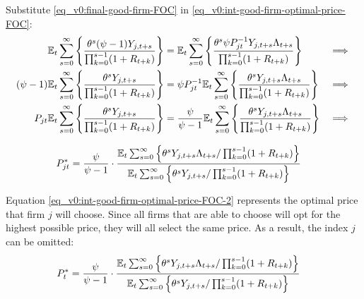\documentclass[
thesis.tex
]{subfiles}
\begin{document}
	
	Substitute \ref{eq_v0:final-good-firm-FOC} in \ref{eq_v0:int-good-firm-optimal-price-FOC}:
	\begin{alignat}{2}
		{\mathbb{E}_{t}} \sum_{s=0}^{\infty} \Bigg\{ \frac{\theta^s (\psi-1) Y_{j,t+s}}{\prod_{k=0}^{s-1}(1+R_{t+k})} \Bigg\} &= {\mathbb{E}_{t}} \sum_{s=0}^{\infty} \Bigg\{ \frac{\theta^s \psi P_{jt}^{-1} Y_{j,t+s} \Lambda_{t+s}}{\prod_{k=0}^{s-1}(1+R_{t+k})}  \Bigg\} &\implies \nonumber \\
		(\psi-1) {\mathbb{E}_{t}} \sum_{s=0}^{\infty} \Bigg\{ \frac{\theta^s Y_{j,t+s}}{\prod_{k=0}^{s-1}(1+R_{t+k})} \Bigg\} &= \psi P_{jt}^{-1} {\mathbb{E}_{t}} \sum_{s=0}^{\infty} \Bigg\{ \frac{\theta^s Y_{j,t+s} \Lambda_{t+s}}{\prod_{k=0}^{s-1}(1+R_{t+k})}  \Bigg\} &\implies \nonumber \\
		P_{jt} {\mathbb{E}_{t}} \sum_{s=0}^{\infty} \Bigg\{ \frac{\theta^s Y_{j,t+s}}{\prod_{k=0}^{s-1}(1+R_{t+k})} \Bigg\} &= \frac{\psi}{\psi-1} {\mathbb{E}_{t}} \sum_{s=0}^{\infty} \Bigg\{ \frac{\theta^s Y_{j,t+s} \Lambda_{t+s}}{\prod_{k=0}^{s-1}(1+R_{t+k})}  \Bigg\} &\implies \nonumber
	\end{alignat}
	
	\vspace*{-1cm}
	
	\begin{align}
		\label{eq_v0:int-good-firm-optimal-price-FOC-2}
		P_{jt}^\ast &= 
		\frac{\psi}{\psi-1} \cdot
		\frac{
			{\mathbb{E}_{t}} \sum_{s=0}^{\infty} \left\{ 
			\theta^s Y_{j,t+s} \Lambda_{t+s} / \prod_{k=0}^{s-1}(1+R_{t+k}) \right\} } {{\mathbb{E}_{t}} \sum_{s=0}^{\infty} \left\{
			\theta^s Y_{j,t+s} / \prod_{k=0}^{s-1}(1+R_{t+k}) \right\}}
	\end{align}
	
	
	Equation \ref{eq_v0:int-good-firm-optimal-price-FOC-2} represents the optimal price that firm $j$ will choose. Since all firms that are able to choose will opt for the highest possible price, they will all select the same price. As a result, the index $j$ can be omitted:
	\begin{align}
		\label{eq_v0:int-good-firm-optimal-price-FOC-3}
		P_t^\ast &= 
		\frac{\psi}{\psi-1} \cdot
		\frac{
			{\mathbb{E}_{t}} \sum_{s=0}^{\infty} \left\{ 
			\theta^s Y_{j,t+s} \Lambda_{t+s} / \prod_{k=0}^{s-1}(1+R_{t+k}) \right\} } {{\mathbb{E}_{t}} \sum_{s=0}^{\infty} \left\{
			\theta^s Y_{j,t+s} / \prod_{k=0}^{s-1}(1+R_{t+k}) \right\}}
	\end{align}
	
\end{document}
